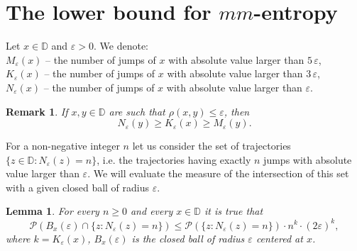 \documentclass[12pt]{article}
\newcommand\D{\mathbb D}
\let\ep\varepsilon
\newcommand\PP{\mathcal P}
\newcommand\ro{\rho}
\let\le\leqslant
\let\ge\geqslant
\newtheorem{lemma}[theorem]{Lemma}
\newtheorem{remark}[theorem]{Remark}
\theoremstyle{definition}
\begin{document}


\section{The lower bound for $mm$-entropy}
\label{s:lower}
   
Let $x\in \D$ 
and $\ep>0$.  We denote:
\\ $M_\ep(x)$ -- the number of jumps of $x$ with absolute value larger than $5\,\ep$,
\\ $K_\ep(x)$ --  the number of jumps of $x$ with absolute value larger than $3\,\ep$,
\\ $N_\ep(x)$ -- the number of jumps of $x$ with absolute value larger than $\ep$.

\begin{remark}
If $x,y\in\D$  are such that $\ro(x,y) \le \ep$, then
\begin{equation}\label{lowerbound: remark1}
        N_\ep(y) \ge K_\ep(x) \ge M_\ep(y).
\end{equation}
\end{remark}

For a non-negative integer $n$ let us consider the set of trajectories 
$\{z\in\D: N_\ep(z) = n\}$, 
i.e. the trajectories having exactly $n$ jumps with absolute value larger than $\ep$. 
We will evaluate the measure of the intersection of this set with a given closed ball of radius
$\ep$.
    
\begin{lemma} \label{lemma1}
For every $n \ge 0$ and every $x\in \D$ it is true that
\begin{equation*}
    \PP(B_{x}(\ep) \cap \{z: N_\ep(z) = n\}) 
    \le \PP(\{z:N_\ep(z) = n\})   \cdot n^k \cdot (2\ep)^k,
\end{equation*}
where $k = K_\ep(x)$, $B_x(\ep)$ is the closed ball of radius $\ep$ centered at $x$. 
\end{lemma}
\end{document}
